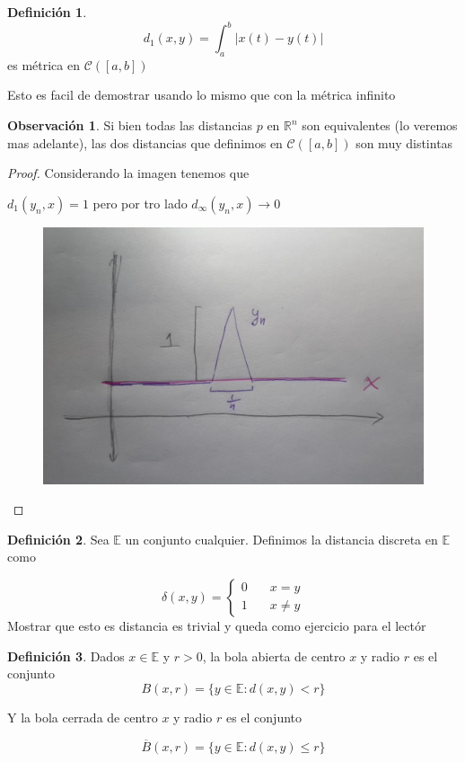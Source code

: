 \documentclass[12pt]{article}
\newcommand{\R}{\mathbb{R}}
\newcommand{\E}{\mathbb{E}}
\newcommand{\ra}{\rightarrow}
\newcommand{\ol}{\overline}
\theoremstyle{definition}
\newtheorem{definition}{Definición}[section]
\newtheorem*{remark}{Observación}
\begin{document}
\begin{definition}
  $$d_{1}(x,y) = \int_{a}^{b} |x(t) - y(t)| $$ es métrica en $\mathcal{C}([a,b])$ 

  Esto es facil de demostrar usando lo mismo que con la métrica infinito
\end{definition}

\begin{remark}
  Si bien todas las distancias $p$ en $\R^n$ son equivalentes (lo veremos mas adelante), las dos distancias que definimos en $\mathcal{C}([a,b])$ son muy distintas
  \begin{proof}
    Considerando la imagen tenemos que 

    $d_{1}(y_{n}, x) = 1$ pero por tro lado $d_{\infty}(y_{n},x) \ra 0$
  \begin{figure}[ht!]
    \includegraphics[width =0.5 \columnwidth]{funcion.jpeg}
  \end{figure}
\end{proof}
\end{remark}

\begin{definition}
  Sea $\E$ un conjunto cualquier. Definimos la distancia discreta en $\E$ como 

  $$
  \delta(x,y) = \left\{
        \begin{array}{ll}
            0 & \quad x = y \\
            1 & \quad x \neq y
        \end{array}
    \right.
$$
Mostrar que esto es distancia es trivial y queda como ejercicio para el lectór 

\end{definition}
\begin{definition}
  Dados $x \in \E$ y $r>0$, la bola abierta de centro $x$ y radio $r $ es el conjunto
  $$ B(x,r) = \{y \in \E : d(x,y) < r\}$$

Y la bola cerrada de centro $x$ y radio $r$ es el conjunto

$$ \ol B(x,r) = \{y \in \E : d(x,y) \leq r\}$$
\end{definition}
\end{document}
